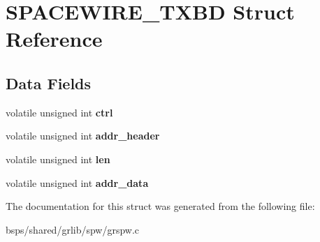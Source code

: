 \hypertarget{structSPACEWIRE__TXBD}{}\section{S\+P\+A\+C\+E\+W\+I\+R\+E\+\_\+\+T\+X\+BD Struct Reference}
\label{structSPACEWIRE__TXBD}
\subsection*{Data Fields}
\begin{DoxyCompactItemize}
\item 
\mbox{\label{structSPACEWIRE__TXBD_a52597f986c38f534bef8b76e0999175d}} 
volatile unsigned int {\bfseries ctrl}
\item 
\mbox{\label{structSPACEWIRE__TXBD_a0ea2624d8c79dc81b311ad6648ebf118}} 
volatile unsigned int {\bfseries addr\+\_\+header}
\item 
\mbox{\label{structSPACEWIRE__TXBD_a2cf57e831a8adcbcac1890b368529caa}} 
volatile unsigned int {\bfseries len}
\item 
\mbox{\label{structSPACEWIRE__TXBD_ae092ffa82f9b77196a18b1b9f764bac7}} 
volatile unsigned int {\bfseries addr\+\_\+data}
\end{DoxyCompactItemize}


The documentation for this struct was generated from the following file\+:\begin{DoxyCompactItemize}
\item 
bsps/shared/grlib/spw/grspw.\+c\end{DoxyCompactItemize}
